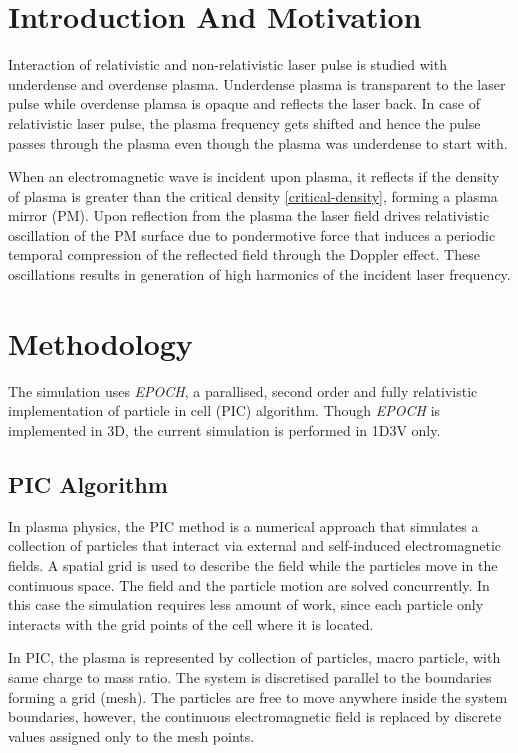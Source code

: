\documentclass[]{article}
\begin{document}
\section{Introduction And Motivation}
Interaction of relativistic and non-relativistic laser pulse is studied with underdense and overdense plasma. Underdense plasma is transparent to the laser pulse while overdense plamsa is opaque and reflects the laser back.
In case of relativistic laser pulse, the plasma frequency gets shifted and hence the pulse passes through the plasma even though the plasma was underdense to start with.

When an electromagnetic wave is incident upon plasma, it reflects if the density of plasma is greater than the critical density \ref{critical-density}, forming a plasma mirror (PM). Upon reflection from the plasma the laser field drives relativistic oscillation of the PM surface due to pondermotive force that induces a periodic temporal compression of the reflected field through the Doppler effect. These oscillations results in generation of high harmonics of the incident laser frequency.\cite{lichters}


\section{Methodology}
The simulation uses \textit{EPOCH}, a parallised, second order and fully relativistic implementation of particle in cell (PIC) algorithm.\cite{epoch} Though \textit{EPOCH} is implemented in 3D, the current simulation is performed in 1D3V only.
\subsection{PIC Algorithm}
In plasma physics, the PIC method is a numerical approach that simulates a collection
of particles that interact via external and self-induced electromagnetic fields. A
spatial grid is used to describe the field while the particles move in the continuous space. The field and the particle motion are solved concurrently. In this case the simulation
requires less amount of work, since each particle only interacts with the grid points of
the cell where it is located.\cite{suciu}

In PIC, the plasma is represented by collection of particles, macro particle, with same charge to mass ratio. The system is discretised parallel to the boundaries forming a grid (mesh). The particles are free to move anywhere inside the system boundaries, however, the continuous electromagnetic field is replaced by discrete values assigned only to the mesh points.
\end{document}
